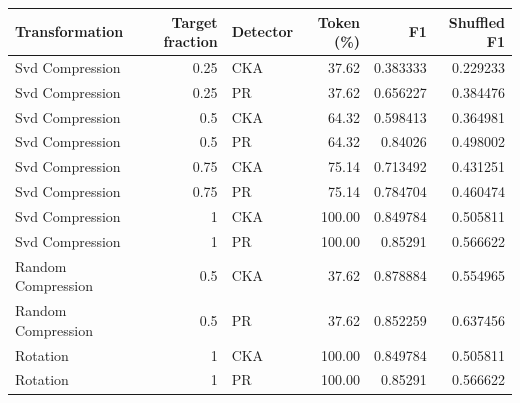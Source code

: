 \begin{center}\small
\begin{tabular}{@{}lrlrrr@{}}
\toprule
Transformation & Target fraction & Detector & Token (\%) & F1 & Shuffled F1 \\
\midrule
Svd Compression & 0.25 & CKA & 37.62 & 0.383333 & 0.229233 \\
Svd Compression & 0.25 & PR & 37.62 & 0.656227 & 0.384476 \\
Svd Compression & 0.5 & CKA & 64.32 & 0.598413 & 0.364981 \\
Svd Compression & 0.5 & PR & 64.32 & 0.84026 & 0.498002 \\
Svd Compression & 0.75 & CKA & 75.14 & 0.713492 & 0.431251 \\
Svd Compression & 0.75 & PR & 75.14 & 0.784704 & 0.460474 \\
Svd Compression & 1 & CKA & 100.00 & 0.849784 & 0.505811 \\
Svd Compression & 1 & PR & 100.00 & 0.85291 & 0.566622 \\
Random Compression & 0.5 & CKA & 37.62 & 0.878884 & 0.554965 \\
Random Compression & 0.5 & PR & 37.62 & 0.852259 & 0.637456 \\
Rotation & 1 & CKA & 100.00 & 0.849784 & 0.505811 \\
Rotation & 1 & PR & 100.00 & 0.85291 & 0.566622 \\
\bottomrule
\end{tabular}
\end{center}
